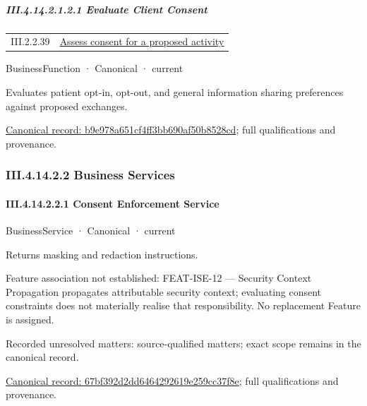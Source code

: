 \subparagraph*{III.4.14.2.1.2.1 Evaluate Client Consent}
\label{navigation:III.4.14.2.1.2.1}

\begin{longtable}{p{.22\linewidth}p{.73\linewidth}}
III.2.2.39 & \hyperref[element:17c66eb17d6040d09e250e787be71719]{Assess consent for a proposed activity} \\
\end{longtable}
\label{element:b9e978a651cf4ff3bb690af50b8528cd}
{\small BusinessFunction · Canonical · current}\par

Evaluates patient opt-in, opt-out, and general information sharing preferences against proposed exchanges.


{\footnotesize \href{../../../../continuum/business/business-function/b9e978a651cf4ff3bb690af50b8528cd.md}{Canonical record: b9e978a651cf4ff3bb690af50b8528cd}; full qualifications and provenance.}\par
\subsubsection*{III.4.14.2.2 Business Services}
\label{navigation:III.4.14.2.2}

\paragraph*{III.4.14.2.2.1 Consent Enforcement Service}
\label{navigation:III.4.14.2.2.1}

\label{element:67bf392d2dd6464292619e259cc37f8e}
{\small BusinessService · Canonical · current}\par

Returns masking and redaction instructions.



Feature association not established: FEAT-ISE-12 — Security Context Propagation propagates attributable security context; evaluating consent constraints does not materially realise that responsibility. No replacement Feature is assigned.


{\small Recorded unresolved matters: source-qualified matters; exact scope remains in the canonical record.}\par
{\footnotesize \href{../../../../continuum/business/business-service/67bf392d2dd6464292619e259cc37f8e.md}{Canonical record: 67bf392d2dd6464292619e259cc37f8e}; full qualifications and provenance.}\par
